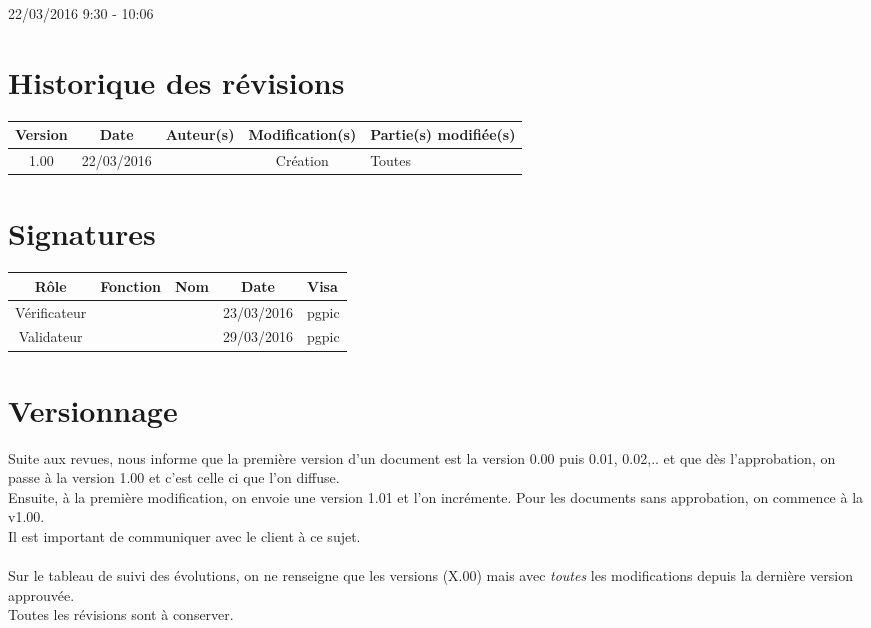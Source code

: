 \documentclass [a4paper] {article}
\begin{document}
\rhead{}

22/03/2016
\hfill   
\hfill 	9:30 - 10:06 				%



\section*{Historique des révisions}
\begin{center}
			\begin{tabular}{| c | c | c | c | p{4cm} |}
				\hline
				\rowcolor{Gray}
				Version & Date & Auteur(s) & Modification(s) & Partie(s) modifiée(s)		 \\
				\hline
				1.00 & 22/03/2016 & \Pierre & Création & Toutes \\
		\hline		
			\end{tabular}
		\end{center}

\section*{Signatures}

		\begin{center}
			\begin{tabular}{| c | c | c | c | p{4cm} |}
				\hline
				\rowcolor{Gray}
				Rôle & Fonction & Nom & Date & Visa		 \\
				\hline
				Vérificateur & \RQA & \Kafui & 23/03/2016 & pgpic \\[30pt]
				\hline
				Validateur & \CP & \Sergi & 29/03/2016 & pgpic \\[30pt]	
				\hline
			\end{tabular}
		\end{center}


\section{Versionnage}
Suite aux revues, \nomTuteurQualite{} nous informe que la première version d'un document est la version 0.00 puis 0.01, 0.02,.. et que dès l'approbation, on passe à la version 1.00 et c'est celle ci que l'on diffuse. \\
Ensuite, à la première modification, on envoie une version 1.01 et l'on incrémente. Pour les documents sans approbation, on commence à la v1.00. \\
Il est important de communiquer avec le client à ce sujet. \\ ~ \\
Sur le tableau de suivi des évolutions, on ne renseigne que les versions (X.00) mais avec \emph{toutes} les modifications depuis la dernière version approuvée.\\
Toutes les révisions sont à conserver.
\end{document}

